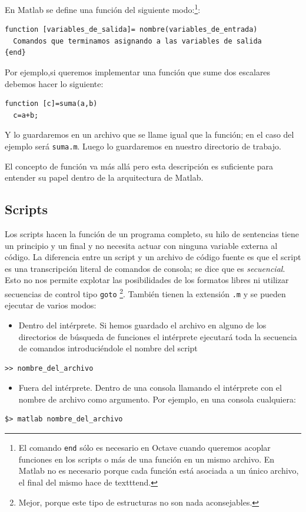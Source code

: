 En Matlab se define una función del siguiente modo:\footnote{El comando
  \texttt{end} sólo es necesario en Octave cuando queremos acoplar
  funciones en los scripts o más de una función en un mismo archivo.
  En Matlab no es necesario porque cada función está asociada a un
  único archivo, el final del mismo hace de texttt{end}.}:

\begin{verbatim}
function [variables_de_salida]= nombre(variables_de_entrada)
  Comandos que terminamos asignando a las variables de salida
{end}
\end{verbatim}
 
Por ejemplo,si queremos implementar una función que sume dos escalares 
debemos hacer lo siguiente:

\begin{verbatim}
function [c]=suma(a,b)
  c=a+b;
\end{verbatim}

Y lo guardaremos en un archivo que se llame igual que la función; en
el caso del ejemplo será \texttt{suma.m}. Luego lo guardaremos en nuestro
directorio de trabajo.

El concepto de función va más allá pero esta descripción es suficiente
para entender su papel dentro de la arquitectura de Matlab.


\subsection{Scripts}

Los scripts hacen la función de un programa completo, su hilo de
sentencias tiene un principio y un final y no necesita actuar con
ninguna variable externa al código. La diferencia entre un
script y un archivo de código fuente es que el script es
una transcripción literal de comandos de consola; se dice que es
\emph{secuencial}.  Esto no nos permite explotar las posibilidades de
los formatos libres ni utilizar secuencias de control tipo
\texttt{goto}%
\footnote{Mejor, porque este tipo de estructuras no son nada
  aconsejables.%
}. También tienen la extensión \texttt{.m} y se pueden ejecutar de
varios modos:

\begin{itemize}
\item Dentro del intérprete. Si hemos guardado el archivo en alguno de
  los directorios de búsqueda de funciones el intérprete ejecutará
  toda la secuencia de comandos introduciéndole el nombre del script
\end{itemize}
\begin{verbatim}
>> nombre_del_archivo
\end{verbatim}
\begin{itemize}
\item Fuera del intérprete. Dentro de una consola llamando el
  intérprete con el nombre de archivo como argumento. Por ejemplo, en
  una consola cualquiera:
\end{itemize}
\begin{verbatim}
$> matlab nombre_del_archivo
\end{verbatim}


